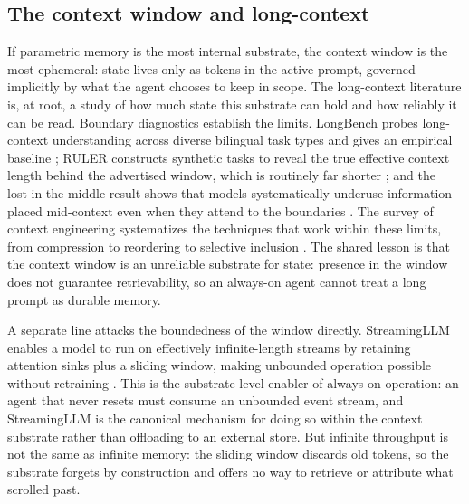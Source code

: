 \subsection{The context window and long-context}

If parametric memory is the most internal substrate, the context window is the most ephemeral: state lives only as tokens in the active prompt, governed implicitly by what the agent chooses to keep in scope. The long-context literature is, at root, a study of how much state this substrate can hold and how reliably it can be read. Boundary diagnostics establish the limits. LongBench probes long-context understanding across diverse bilingual task types and gives an empirical baseline \citep{bai2024longbenchbilingualmultitaskbenchmark}; RULER constructs synthetic tasks to reveal the true effective context length behind the advertised window, which is routinely far shorter \citep{hsieh2024rulerwhatsrealcontext}; and the lost-in-the-middle result shows that models systematically underuse information placed mid-context even when they attend to the boundaries \citep{liu2023lostmiddlelanguagemodels}. The survey of context engineering systematizes the techniques that work within these limits, from compression to reordering to selective inclusion \citep{mei2025surveycontextengineering}. The shared lesson is that the context window is an unreliable substrate for state: presence in the window does not guarantee retrievability, so an always-on agent cannot treat a long prompt as durable memory.

A separate line attacks the boundedness of the window directly. StreamingLLM enables a model to run on effectively infinite-length streams by retaining attention sinks plus a sliding window, making unbounded operation possible without retraining \citep{xiao2023streamingllm}. This is the substrate-level enabler of always-on operation: an agent that never resets must consume an unbounded event stream, and StreamingLLM is the canonical mechanism for doing so within the context substrate rather than offloading to an external store. But infinite throughput is not the same as infinite memory: the sliding window discards old tokens, so the substrate forgets by construction and offers no way to retrieve or attribute what scrolled past.

